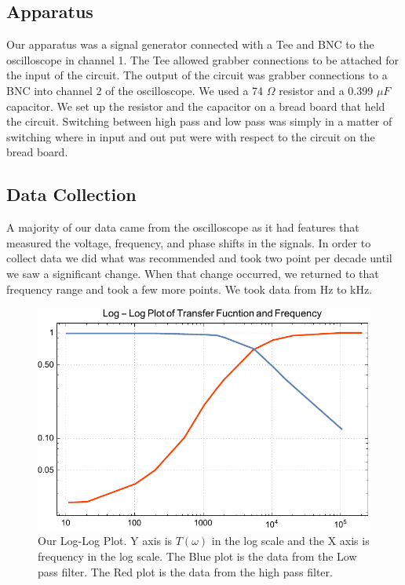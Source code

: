 \documentclass[11pt,letterpaper,onecolumn]{article}
\begin{document}
\subsection{Apparatus}

Our apparatus was  a signal generator connected with a Tee and BNC to the oscilloscope in channel 1. The Tee allowed grabber connections to be attached for the input of the circuit. The output of the circuit was grabber connections to a BNC into channel 2 of the oscilloscope. We used a 74 $\Omega$ resistor and a 0.399 $\mu F$ capacitor. We set up the resistor and the capacitor on a bread board that held the circuit. Switching between high pass and low pass was simply in a matter of switching where in input and out put were with respect to the circuit on the bread board.   






\subsection{Data Collection}

A majority of our data came from the oscilloscope as it had features that measured the voltage, frequency, and phase shifts in the signals. In order to collect data we did what was recommended and took two point per decade until we saw a significant change. When that change occurred, we returned to that frequency range and took a few more points. We took data from Hz to kHz. 

\begin{figure}[H]
    \centering
    \includegraphics[scale = .8]{HighLowpassLogLog.pdf}
    \caption{Our Log-Log Plot. Y axis is $T(\omega)$ in the log scale and the X axis is frequency in the log scale. The Blue plot is the data from the Low pass filter. The Red plot is the data from the high pass filter.}
    \label{fig:loglog}
\end{figure}
\end{document}

